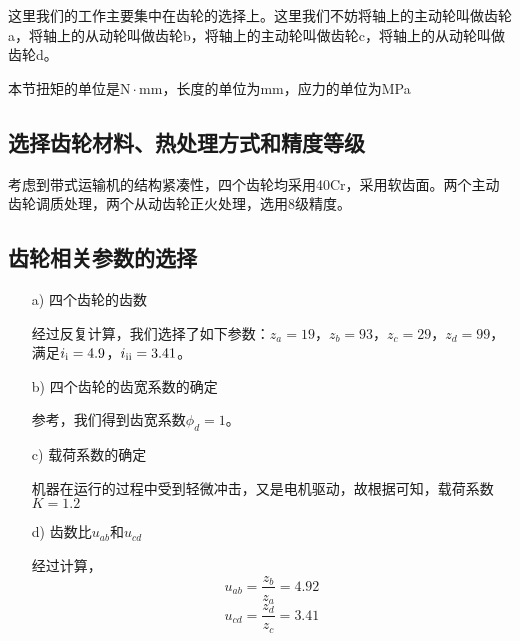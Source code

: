 这里我们的工作主要集中在齿轮的选择上。这里我们不妨将\uppercase\expandafter{}轴上的主动轮叫做齿轮a，将\uppercase\expandafter{}轴上的从动轮叫做齿轮b，将\uppercase\expandafter{}轴上的主动轮叫做齿轮c，将\uppercase\expandafter{}轴上的从动轮叫做齿轮d。
\par 本节扭矩的单位是$\mathrm{N}\cdot \mathrm{mm}$，长度的单位为mm，应力的单位为MPa
\subsection{选择齿轮材料、热处理方式和精度等级}
考虑到带式运输机的结构紧凑性，四个齿轮均采用40Cr，采用软齿面。两个主动齿轮调质处理，两个从动齿轮正火处理，选用8级精度。
\subsection{齿轮相关参数的选择}
\begin{itemize}
	\item[a)] 四个齿轮的齿数
	\par 经过反复计算，我们选择了如下参数：$z_a=19$，$z_b=93$，$z_c=29$，$z_d=99$，满足$i_{\mathrm{\uppercase\expandafter{\romannumeral1}}}=4.9$，$i_{\mathrm{\uppercase\expandafter{\romannumeral2}}}=3.41$。
	\item[b)] 四个齿轮的齿宽系数的确定
	\par 参考\cite{2}，我们得到齿宽系数$\phi_d=1$。
	\item[c)] 载荷系数的确定
	\par 机器在运行的过程中受到轻微冲击，又是电机驱动，故根据\cite{2}可知，载荷系数$K=1.2$
	\item[d)] 齿数比$u_{ab}$和$u_{cd}$
	\par 经过计算，$$u_{ab}=\frac{z_b}{z_a}=4.92$$	$$u_{cd}=\frac{z_d}{z_c}=3.41$$
\end{itemize}
